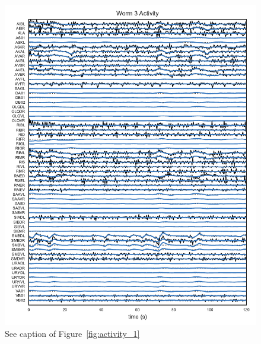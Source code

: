 \documentclass{article}
\begin{document}
\begin{figure}[h]
  \centering
  \includegraphics[width=5.5in]{figures/lds/y_2}
  \caption{See caption of Figure~\ref{fig:activity_1}}
  \label{fig:activity_3}
\end{figure}
\end{document}
